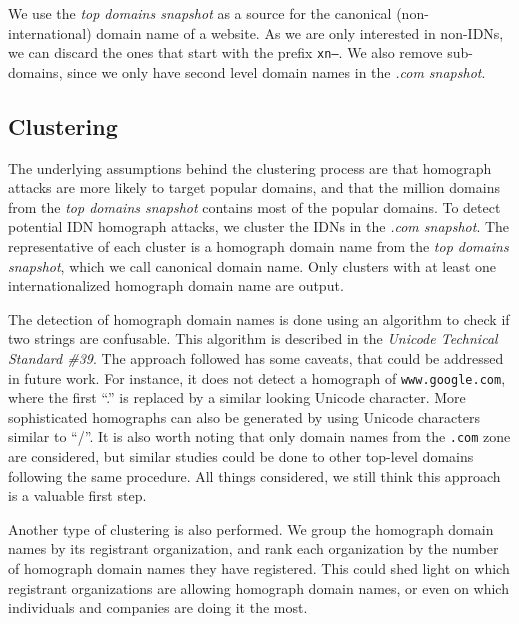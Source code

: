 \documentclass[letterpaper,twocolumn,10pt]{article}
\begin{document}
We use the \textit{top domains snapshot} as a source for the canonical (non-international) domain name of a website.
As we are only interested in non-IDNs, we can discard the ones that start with the prefix \texttt{xn--}.
We also remove sub-domains, since we only have second level domain names in the \textit{.com snapshot}.

\subsection{Clustering}
The underlying assumptions behind the clustering process are that homograph attacks are more likely to target popular domains, and that the million domains from the \textit{top domains snapshot} contains most of the popular domains.
To detect potential IDN homograph attacks, we cluster the IDNs in the \textit{.com snapshot}.
The representative of each cluster is a homograph domain name from the \textit{top domains snapshot}, which we call canonical domain name.
Only clusters with at least one internationalized homograph domain name are output.

The detection of homograph domain names is done using an algorithm to check if two strings are confusable.
This algorithm is described in the \textit{Unicode Technical Standard \#39}\footnotemark[\ref{tr39}].
The approach followed has some caveats, that could be addressed in future work.
For instance, it does not detect a homograph of \texttt{www.google.com}, where the first ``.'' is replaced by a similar looking Unicode character.
More sophisticated homographs can also be generated by using Unicode characters similar to ``/''.
It is also worth noting that only domain names from the \texttt{.com} zone are considered, but similar studies could be done to other top-level domains following the same procedure.
All things considered, we still think this approach is a valuable first step.

Another type of clustering is also performed.
We group the homograph domain names by its registrant organization, and rank each organization by the number of homograph domain names they have registered.
This could shed light on which registrant organizations are allowing homograph domain names, or even on which individuals and companies are doing it the most.
\end{document}
